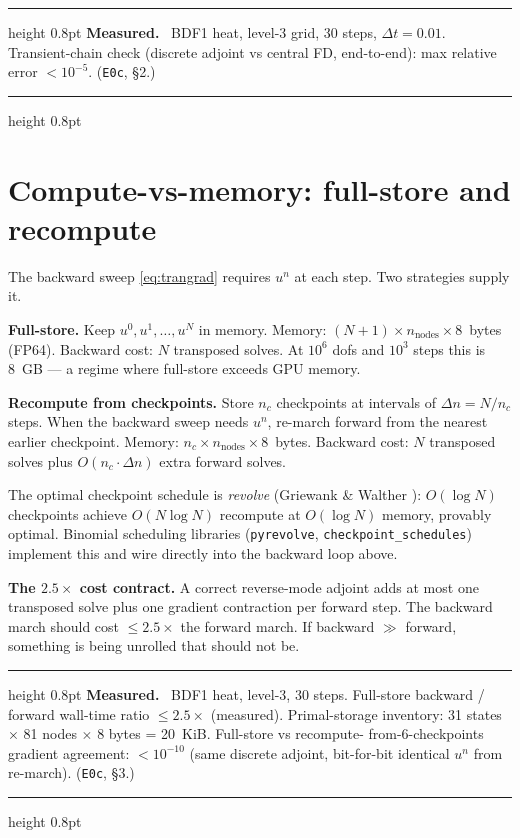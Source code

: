 \documentclass[11pt]{article}
\newenvironment{measured}{%
  \par\medskip\noindent\begin{minipage}{\linewidth}
  \hrule height 0.8pt \smallskip
  \textbf{Measured.}\ }{%
  \smallskip\hrule height 0.8pt \end{minipage}\par\medskip}
\begin{document}
\begin{measured}
BDF1 heat, level-3 grid, 30 steps, $\Delta t = 0.01$.  Transient-chain
check (discrete adjoint vs central FD, end-to-end): max relative error
$< 10^{-5}$.  (\texttt{E0c}, \S2.)
\end{measured}

\section{Compute-vs-memory: full-store and recompute}
\label{sec:cvm}

The backward sweep \eqref{eq:trangrad} requires $u^n$ at each step.  Two
strategies supply it.

\textbf{Full-store.} Keep $u^0, u^1, \ldots, u^N$ in memory.  Memory:
$(N+1) \times n_{\mathrm{nodes}} \times 8$~bytes (FP64).  Backward cost:
$N$ transposed solves.  At $10^6$ dofs and $10^3$ steps this is 8~GB
--- a regime where full-store exceeds GPU memory.

\textbf{Recompute from checkpoints.}  Store $n_c$ checkpoints at
intervals of $\Delta n = N/n_c$ steps.  When the backward sweep needs
$u^n$, re-march forward from the nearest earlier checkpoint.  Memory:
$n_c \times n_{\mathrm{nodes}} \times 8$~bytes.  Backward cost: $N$
transposed solves plus $O(n_c \cdot \Delta n)$ extra forward solves.

The optimal checkpoint schedule is \emph{revolve} (Griewank \& Walther
\cite{griewank2000}): $O(\log N)$ checkpoints achieve $O(N \log N)$
recompute at $O(\log N)$ memory, provably optimal.  Binomial scheduling
libraries (\texttt{pyrevolve}, \texttt{checkpoint\_schedules}) implement
this and wire directly into the backward loop above.

\textbf{The $2.5\times$ cost contract.}  A correct reverse-mode adjoint
adds at most one transposed solve plus one gradient contraction per forward
step.  The backward march should cost $\leq 2.5\times$ the forward march.
If backward $\gg$ forward, something is being unrolled that should not be.

\begin{measured}
BDF1 heat, level-3, 30 steps.  Full-store backward / forward wall-time
ratio $\leq 2.5\times$ (measured).  Primal-storage inventory: 31 states
$\times$ 81 nodes $\times$ 8 bytes = 20~KiB.  Full-store vs recompute-
from-6-checkpoints gradient agreement: $< 10^{-10}$ (same discrete
adjoint, bit-for-bit identical $u^n$ from re-march).
(\texttt{E0c}, \S3.)
\end{measured}
\end{document}
